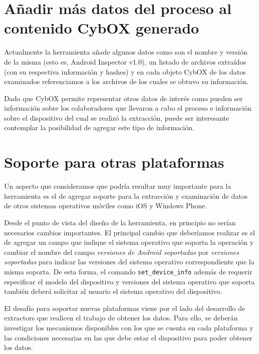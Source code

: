 \section{Añadir más datos del proceso al contenido CybOX generado}
Actualmente la herramienta añade algunos datos como son el nombre y versión de la misma (esto es, Android Inspector v1.0), un listado de archivos extraídos (con su respectiva información y hashes) y en cada objeto CybOX de los datos examinados referenciamos a los archivos de los cuales se obtuvo su información.

Dado que CybOX permite representar otros datos de interés como pueden ser información sobre los colaboradores que llevaron a cabo el proceso e información sobre el dispositivo del cual se realizó la extracción, puede ser interesante contemplar la posibilidad de agregar este tipo de información.

\section{Soporte para otras plataformas}
Un aspecto que consideramos que podría resultar muy importante para la herramienta es el de agregar soporte para la extracción y examinación de datos de otros sistemas operativos móviles como iOS y Windows Phone.

Desde el punto de vista del diseño de la herramienta, en principio no serían necesarios cambios importantes. El principal cambio que deberíamos realizar es el de agregar un campo que indique el sistema operativo que soporta la operación y cambiar el nombre del campo \emph{versiones de Android soportadas} por \emph{versiones soportadas} para indicar las versiones del sistema operativo correspondiente que la misma soporta. De esta forma, el comando \texttt{set\_device\_info} además de requerir especificar el modelo del dispositivo y versiones del sistema operativo que soporta también deberá solicitar al usuario el sistema operativo del dispositivo.

El desafío para soportar nuevas plataformas viene por el lado del desarrollo de extractors que realicen el trabajo de obtener los datos. Para ello, se deberán investigar los mecanismos disponibles con los que se cuenta en cada plataforma y las condiciones necesarias en las que debe estar el dispositivo para poder obtener los datos.
